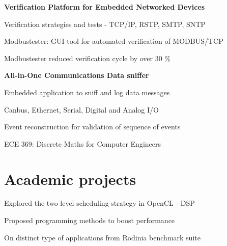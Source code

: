 \documentclass[letterpaper]{deedy-resume}
\begin{document}
\begin{minipage}[t]{0.66\textwidth}
\vspace{\topsep} %
\textbf{Verification Platform for Embedded Networked Devices}
\begin{tightitemize}
\item Verification strategies and tests - TCP/IP, RSTP, SMTP, SNTP
\item Modbustester: GUI tool for automated verification of MODBUS/TCP
\item Modbustester reduced verification cycle by over 30 \% 
\end{tightitemize}
\sectionspace %
\textbf{All-in-One Communications Data sniffer}
\begin{tightitemize}
\item Embedded application to sniff and log data messages
\item Canbus, Ethernet, Serial, Digital and Analog I/O
\item Event reconstruction for validation of sequence of events
\end{tightitemize}
\sectionspace %
\sectionspace %
\begin{tightitemize}
\item ECE 369: Discrete Maths for Computer Engineers   
\end{tightitemize}
\vspace{0.5 mm}
\section{Academic projects}
\vspace{0.5 mm} %
\begin{tightitemize}
\item Explored the two level scheduling strategy in OpenCL - DSP
\item Proposed programming methods to boost performance
\item On distinct type of applications from Rodinia benchmark suite
\end{tightitemize}


\end{minipage}
\end{document}
